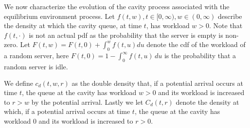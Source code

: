 \documentclass[12pt]{report}
\begin{document}
We now characterize the evolution of the cavity process associated with the equilibrium environment process.
Let $f(t,w), t \in [0,\infty), w \in (0,\infty)$ describe the density at which the cavity queue, at time $t$, has workload $w>0$. Note that $f(t,\cdot)$ is not an actual pdf as the probability that the server is empty is non-zero. Let $F(t,w) = F(t,0) + \int_0^w f(t,u) du$ denote the cdf of the workload of a random server, here $F(t,0) = 1-\int_0^\infty f(t,u) \, du$ is the probability that a random server is idle.

We define $c_d(t,w,r)$ as the double density that, if a potential arrival occurs at time $t$, the queue at the cavity has workload $w > 0$ and its workload is increased to $r > w$ by the potential arrival. Lastly we let $C_d(t,r)$ denote the density at which, if a potential arrival occurs at time $t$, the queue at the cavity has workload $0$ and its workload is increased to $r > 0$. 
\end{document}
